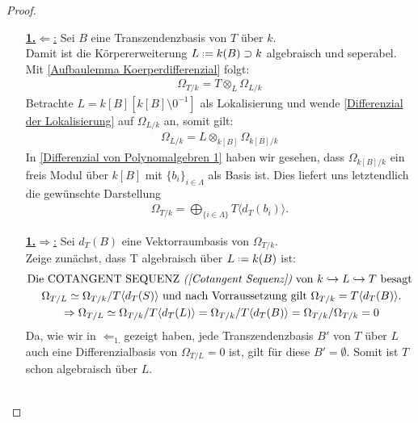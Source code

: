 \documentclass[10pt,a4paper]{report}
\newcommand{\comment}[1]{}
\newcommand{\divR}[2]{\Omega_{#1/#2}}
\newcommand{\divf}[1]{d_{#1}}
\newcommand{\Tensor}[3]{#1 \otimes_{#2} #3}
\newcommand{\lok}[2]{#1 [#2^{-1}]}
\newcommand*{\defeq}{\mathrel{\vcenter{\baselineskip0.5ex \lineskiplimit0pt
                     \hbox{\scriptsize.}\hbox{\scriptsize.}}}%
                     =}
\newcommand{\Verz}[1]{\langle #1 \rangle}
\begin{document}
\begin{proof}
\ \\
\begin{itemize}
\item[\underline{\textbf{1.}\glqq$\Leftarrow$\grqq:}] Sei $B$ eine Transzendenzbasis von $T$ über $k$.\\
Damit ist die Körpererweiterung $L \defeq k(B) \supset k$ algebraisch und seperabel. \comment{ mit \label{*Transzendenzbasisdef}} Mit \cref{Aufbaulemma Koerperdifferenzial} folgt:
\begin{gather*}
\divR{T}{k} = \Tensor{T}{L}{\divR{L}{k}}
\end{gather*}
Betrachte $L = \lok{k[B]}{k[B] \setminus 0}$ als Lokalisierung und wende \cref{Differenzial der Lokalisierung} auf $\divR{L}{k}$ an, somit gilt:
\begin{gather*}
\divR{L}{k} = \Tensor{L}{k[B]}{\divR{k[B]}{k}}
\end{gather*}
In \cref{Differenzial von Polynomalgebren 1} \comment{\label{*Differenzial von Polynomalgebren brauche ich für unendliche Mengen Lambda}} haben wir gesehen, dass $\divR{k[B]}{k}$ ein freis Modul über $k[B]$ mit $\lbrace b_i \rbrace_{i \in \Lambda}$ als Basis ist. Dies liefert uns letztendlich die gewünschte Darstellung
\begin{gather*}
\divR{T}{k} = \bigoplus_{\lbrace i \in \Lambda \rbrace} T \Verz{\divf{T}(b_i)}.
\end{gather*}
\item[\underline{\textbf{1.}\glqq$\Rightarrow$\grqq:}]Sei $\divf{T}(B)$ eine Vektorraumbasis von $\divR{T}{k}$.\\
Zeige zunächst, dass T algebraisch über $L \defeq k(B)$ ist:
\begin{gather*}
\text{Die COTANGENT SEQUENZ \textit{(\cref{Cotangent Sequenz})} von $k \hookrightarrow L \hookrightarrow T$ besagt }\\
\divR{T}{L} \simeq \divR{T}{k}/T \Verz{\divf{T}(S)} \text{ und nach Vorraussetzung gilt } \divR{T}{k} = T \Verz{\divf{T}(B)}.
\\
\Rightarrow \divR{T}{L} \simeq \divR{T}{k}/T\Verz{\divf{T}(L)} = \divR{T}{k}/T\Verz{\divf{T}(B)}=
\divR{T}{k}/\divR{T}{k} = 0
\end{gather*}
Da, wie wir in \glqq$\Leftarrow_{1.}$\grqq gezeigt haben, jede Transzendenzbasis $B'$ von $T$ über $L$ auch eine Differenzialbasis von $\divR{T}{L} = 0$ ist, gilt für diese $B' = \emptyset$. Somit ist $T$ schon algebraisch über $L$.\\
\ \\

\end{itemize}
\end{proof}
\end{document}
